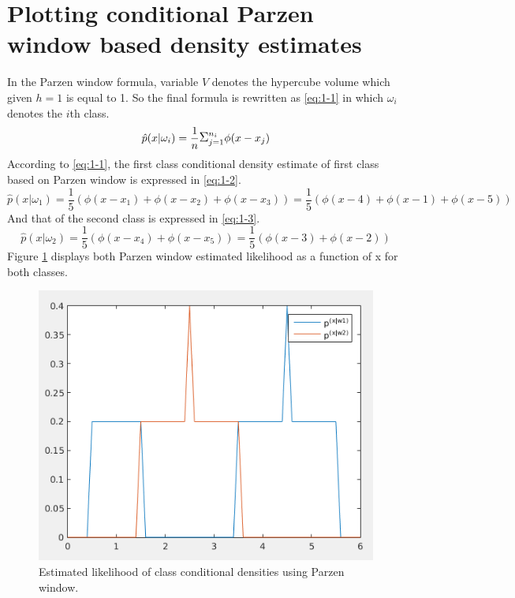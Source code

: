 \documentclass[12pt]{article}
\begin{document}

\tableofcontents
\pagebreak

\section{Plotting conditional Parzen window based density estimates}
In the Parzen window formula, variable $V$ denotes the hypercube volume which given $h = 1$ is equal to 1. So the final formula is rewritten as \eqref{eq:1-1} in which $\omega_i$ denotes the $i$th class.
\begin{equation}
\hat{p}(x|\omega_i) = \frac{1}{n}\mathlarger{\Sigma}_{j=1}^{n_i} \phi(x - x_j)
\label{eq:1-1}
\end{equation}
According to \eqref{eq:1-1}, the first class conditional density estimate of first class based on Parzen window is expressed in \eqref{eq:1-2}.
\begin{equation}
\hat{p}(x|\omega_1) = \frac{1}{5}(\phi(x - x_1) + \phi(x - x_2) + \phi(x - x_3)) =  \frac{1}{5}(\phi(x - 4) + \phi(x - 1) + \phi(x - 5))
\label{eq:1-2}
\end{equation}
And that of the second class is expressed in \eqref{eq:1-3}.
\begin{equation}
\hat{p}(x|\omega_2) = \frac{1}{5}(\phi(x - x_4) + \phi(x - x_5)) =  \frac{1}{5}(\phi(x - 3) + \phi(x - 2))
\label{eq:1-3}
\end{equation}
Figure \ref{fig:1-1} displays both Parzen window estimated likelihood as a function of x for both classes.
\begin{figure}[h]
\centering
\includegraphics[scale=0.4]{Imgs/1-1.png}
\caption{Estimated likelihood of class conditional densities using Parzen window.}
\label{fig:1-1}
\end{figure}
\end{document}

